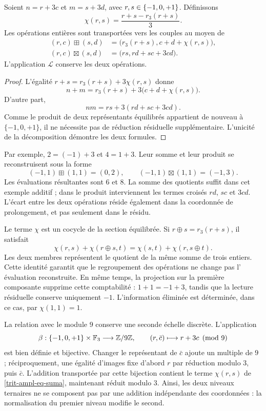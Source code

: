 \begin{proposition}
\label{trit-ampl-prop-aritmetica}
Soient \(n=r+3c\) et \(m=s+3d\), avec \(r,s\in\{-1,0,+1\}\). Définissons
\[
 \chi(r,s)=\frac{r+s-r_3(r+s)}3.
\]
Les opérations entières sont transportées vers les couples au moyen de
\begin{align}
 (r,c)\boxplus(s,d)
 &=\bigl(r_3(r+s),c+d+\chi(r,s)\bigr),
 \label{trit-ampl-eq-suma}\\
 (r,c)\boxtimes(s,d)
 &=\bigl(rs,rd+sc+3cd\bigr).
 \label{trit-ampl-eq-producto}
\end{align}
L'application \(\mathcal L\) conserve les deux opérations.
\end{proposition}
\begin{proof}
L'égalité \(r+s=r_3(r+s)+3\chi(r,s)\) donne
\[
 n+m=r_3(r+s)+3\bigl(c+d+\chi(r,s)\bigr).
\]
D'autre part,
\[
 nm=rs+3(rd+sc+3cd).
\]
Comme le produit de deux représentants équilibrés appartient de nouveau à
\(\{-1,0,+1\}\), il ne nécessite pas de réduction résiduelle supplémentaire. L'unicité
de la décomposition démontre les deux formules.
\end{proof}

Par exemple, \(2=(-1)+3\) et \(4=1+3\). Leur somme et leur produit se reconstruisent
sous la forme
\[
 (-1,1)\boxplus(1,1)=(0,2),\qquad
 (-1,1)\boxtimes(1,1)=(-1,3).
\]
Les évaluations résultantes sont \(6\) et \(8\). La somme des quotients suffit
dans cet exemple additif ; dans le produit interviennent les termes croisés
\(rd\), \(sc\) et \(3cd\). L'écart entre les deux opérations réside
également dans la coordonnée de prolongement, et pas seulement dans le résidu.

Le terme \(\chi\) est un cocycle de la section équilibrée. Si
\(r\oplus s=r_3(r+s)\), il satisfait
\[
 \chi(r,s)+\chi(r\oplus s,t)
 =\chi(s,t)+\chi(r,s\oplus t).
\]
Les deux membres représentent le quotient de la même somme de trois entiers.
Cette identité garantit que le regroupement des opérations ne change pas l'
évaluation reconstruite. En même temps, la projection sur la première
composante supprime cette comptabilité : \(1+1=-1+3\), tandis que la lecture
résiduelle conserve uniquement \(-1\). L'information éliminée est
déterminée, dans ce cas, par \(\chi(1,1)=1\).

La relation avec le module \(9\) conserve une seconde échelle discrète. L'application
\[
 \beta:\{-1,0,+1\}\times\mathbb F_3\longrightarrow\mathbb Z/9\mathbb Z,
 \qquad (r,\bar c)\longmapsto r+3c\pmod9
\]
est bien définie et bijective. Changer le représentant de \(\bar c\) ajoute un multiple de \(9\) ; réciproquement, une égalité d'images fixe d'abord \(r\) par réduction modulo \(3\), puis \(\bar c\). L'addition transportée par cette bijection contient le terme \(\chi(r,s)\) de \eqref{trit-ampl-eq-suma}, maintenant réduit modulo \(3\). Ainsi, les deux niveaux ternaires ne se composent pas par une addition indépendante des coordonnées : la normalisation du premier niveau modifie le second.

